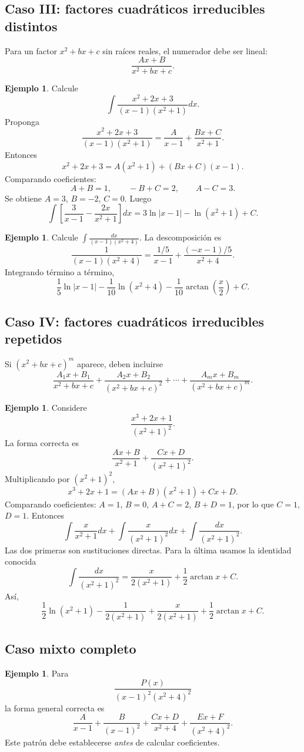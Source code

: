 \documentclass[12pt]{article}
\theoremstyle{definition}
\newtheorem{ejemplo}[teorema]{Ejemplo}
\theoremstyle{remark}
\begin{document}
\subsection*{Caso III: factores cuadráticos irreducibles distintos}
Para un factor $x^2+bx+c$ sin raíces reales, el numerador debe ser lineal:
\[\frac{Ax+B}{x^2+bx+c}.\]
\begin{ejemplo}Calcule
\[\int\frac{x^2+2x+3}{(x-1)(x^2+1)}dx.\]
Proponga
\[\frac{x^2+2x+3}{(x-1)(x^2+1)}=\frac{A}{x-1}+\frac{Bx+C}{x^2+1}.\]
Entonces
\[x^2+2x+3=A(x^2+1)+(Bx+C)(x-1).\]
Comparando coeficientes:
\[A+B=1,\qquad -B+C=2,\qquad A-C=3.\]
Se obtiene $A=3$, $B=-2$, $C=0$. Luego
\[\int\left[\frac3{x-1}-\frac{2x}{x^2+1}\right]dx
=\boxed{3\ln|x-1|-\ln(x^2+1)+C}.\]\end{ejemplo}
\begin{ejemplo}Calcule $\int\frac{dx}{(x-1)(x^2+4)}$. La descomposición es
\[\frac1{(x-1)(x^2+4)}=\frac{1/5}{x-1}+\frac{(-x-1)/5}{x^2+4}.\]
Integrando término a término,
\[\boxed{\frac15\ln|x-1|-\frac1{10}\ln(x^2+4)-\frac1{10}\arctan\left(\frac{x}{2}\right)+C}.\]\end{ejemplo}

\subsection*{Caso IV: factores cuadráticos irreducibles repetidos}
Si $(x^2+bx+c)^m$ aparece, deben incluirse
\[\frac{A_1x+B_1}{x^2+bx+c}+\frac{A_2x+B_2}{(x^2+bx+c)^2}+\cdots+\frac{A_mx+B_m}{(x^2+bx+c)^m}.\]
\begin{ejemplo}Considere
\[\frac{x^3+2x+1}{(x^2+1)^2}.\]
La forma correcta es
\[\frac{Ax+B}{x^2+1}+\frac{Cx+D}{(x^2+1)^2}.\]
Multiplicando por $(x^2+1)^2$,
\[x^3+2x+1=(Ax+B)(x^2+1)+Cx+D.\]
Comparando coeficientes: $A=1$, $B=0$, $A+C=2$, $B+D=1$, por lo que $C=1$, $D=1$. Entonces
\[\int\frac{x}{x^2+1}dx+\int\frac{x}{(x^2+1)^2}dx+\int\frac{dx}{(x^2+1)^2}.\]
Las dos primeras son sustituciones directas. Para la última usamos la identidad conocida
\[\int\frac{dx}{(x^2+1)^2}=\frac{x}{2(x^2+1)}+\frac12\arctan x+C.\]
Así,
\[\boxed{\frac12\ln(x^2+1)-\frac1{2(x^2+1)}+\frac{x}{2(x^2+1)}+\frac12\arctan x+C}.\]\end{ejemplo}

\subsection*{Caso mixto completo}
\begin{ejemplo}Para
\[\frac{P(x)}{(x-1)^2(x^2+4)^2}\]
la forma general correcta es
\[\frac{A}{x-1}+\frac{B}{(x-1)^2}+\frac{Cx+D}{x^2+4}+\frac{Ex+F}{(x^2+4)^2}.\]
Este patrón debe establecerse \emph{antes} de calcular coeficientes.\end{ejemplo}
\end{document}
